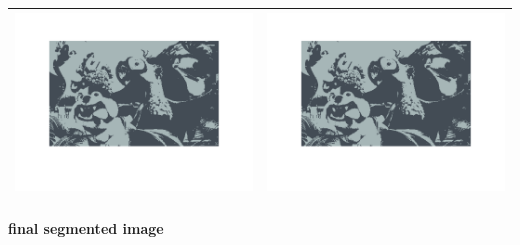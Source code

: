 \documentclass[fleqn]{article}
\newcommand{\myparagraph}[1]{\paragraph{#1}\mbox{}\\}
\begin{document}
\begin{center}
\begin{longtable}{ c | c }
	\includegraphics[scale=0.4]{./pics/task1and2/rio_k=2_random/K=2_iteration_9_random_2_rio.png} & \includegraphics[scale=0.4]{./pics/task1and2/rio_k=2_random/K=2_iteration_10_random_2_rio.png} \\\hline
  \end{longtable}	
\end{center}

\myparagraph{final segmented image}
\end{document}
